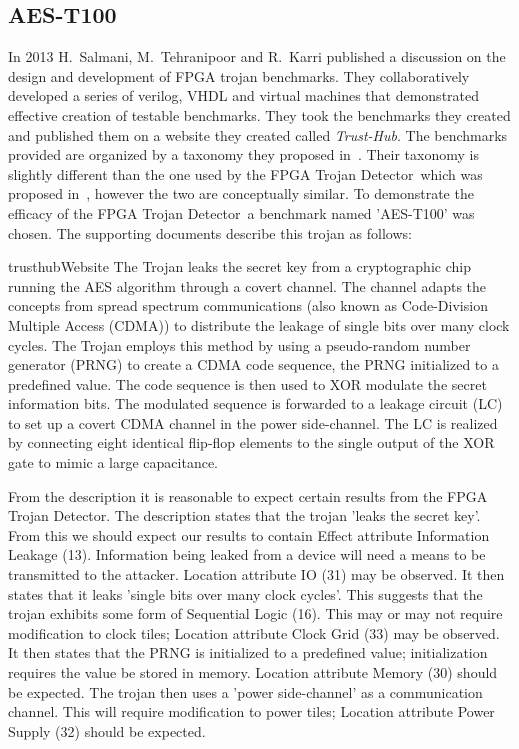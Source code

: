 \documentclass[conference]{IEEEtran}
\newcommand{\Name}{\acrshort{FPGA} Trojan Detector}
\newcommand{\NameNoPeriod}{\Name~}
\begin{document}
\subsection{AES-T100} \label{sec:aesT100}
In 2013 H.~Salmani, M.~Tehranipoor and R.~Karri published a discussion on the design and development of \acrshort{FPGA} trojan benchmarks.
They collaboratively developed a series of verilog, VHDL and virtual machines that demonstrated effective creation of testable benchmarks.
They took the benchmarks they created and published them on a website they created called \textit{Trust-Hub}.
The benchmarks provided are organized by a taxonomy they proposed in~\cite{trustHubPaper}.
Their taxonomy is slightly different than the one used by the \NameNoPeriod which was proposed in~\cite{samerAttribute}, however the two are conceptually similar.
To demonstrate the efficacy of the \NameNoPeriod a benchmark named 'AES-T100' was chosen. 
The supporting documents describe this trojan as follows:
\begin{displaycquote}{trusthubWebsite}
	The Trojan leaks the secret key from a cryptographic chip running the AES algorithm through a covert channel. The channel adapts the concepts from spread spectrum communications (also known as Code-Division Multiple Access (CDMA)) to distribute the leakage of single bits over many clock cycles. The Trojan employs this method by using a pseudo-random number generator (PRNG) to create a CDMA code sequence, the PRNG initialized to a predefined value. The code sequence is then used to XOR modulate the secret information bits. The modulated sequence is forwarded to a leakage circuit (LC) to set up a covert CDMA channel in the power side-channel. The LC is realized by connecting eight identical flip-flop elements to the single output of the XOR gate to mimic a large capacitance.
\end{displaycquote}

From the description it is reasonable to expect certain results from the \Name.
The description states that the trojan 'leaks the secret key'.
From this we should expect our results to contain Effect attribute Information Leakage (13).
Information being leaked from a device will need a means to be transmitted to the attacker.
Location attribute \acrshort{IO} (31) may be observed.
It then states that it leaks 'single bits over many clock cycles'. 
This suggests that the trojan exhibits some form of Sequential Logic (16).
This may or may not require modification to clock tiles; Location attribute Clock Grid (33) may be observed. 
It then states that the PRNG is initialized to a predefined value; initialization requires the value be stored in memory. 
Location attribute Memory (30) should be expected.
The trojan then uses a 'power side-channel' as a communication channel.
This will require modification to power tiles; Location attribute Power Supply (32) should be expected.
\end{document}
